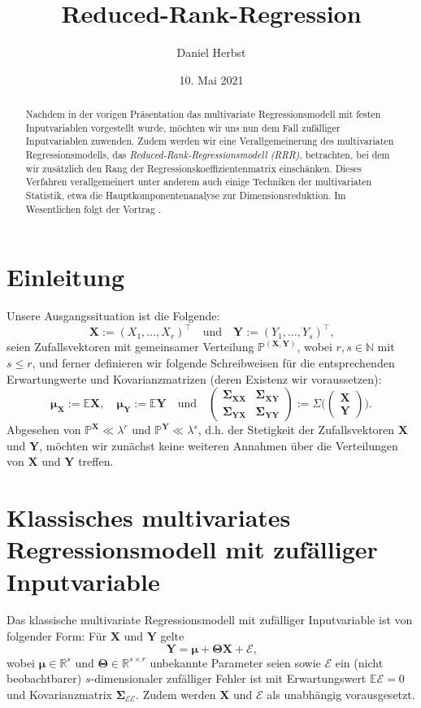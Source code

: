 \documentclass[]{article}
\title{Reduced-Rank-Regression}
\author{Daniel Herbst}
\date{10. Mai 2021}
\newcommand{\Pb}{\mathbb{P}}
\newcommand{\E}{\mathbb{E}}
\newcommand{\R}{\mathbb{R}}
\newcommand{\N}{\mathbb{N}}
\newcommand{\X}{\mathbf{X}}
\newcommand{\Y}{\mathbf{Y}}
\newcommand{\T}{\mathbf{\Theta}}
\newcommand{\muu}{\bm{\mu}}
\newcommand{\Ssigma}{\mathbf{\Sigma}}
\begin{document}
\maketitle

\begin{abstract}
Nachdem in der vorigen Präsentation das multivariate Regressionsmodell mit festen Inputvariablen vorgestellt wurde, möchten wir uns nun dem Fall zufälliger Inputvariablen zuwenden. Zudem werden wir eine Verallgemeinerung des multivariaten Regressionsmodells, das
\textit{Reduced-Rank-Regressionsmodell (RRR)}, betrachten, bei dem wir zusätzlich den Rang der Regressionskoeffizientenmatrix einschänken. Dieses Verfahren verallgemeinert unter anderem auch einige Techniken der multivariaten Statistik, etwa die Hauptkomponentenanalyse zur Dimensionsreduktion. Im Wesentlichen folgt der Vortrag 
\cite[Kapitel 6.3]{Iz08}.
\end{abstract}

\section{Einleitung}
\label{Einleitung}
Unsere Ausgangssituation ist die Folgende:
$$\X := (X_1, \dots, X_r)^\top \quad \text{und} \quad \Y := (Y_1, \dots, Y_s)^\top \text{,}$$
seien Zufallsvektoren mit gemeinsamer Verteilung $\Pb^{(\X, \Y)}$, wobei $r, s \in \N$ mit $s \leq r$,
und ferner definieren wir folgende Schreibweisen für die entsprechenden Erwartungwerte und Kovarianzmatrizen (deren Existenz wir voraussetzen):
$$ \muu_\X := \E\X, \quad \muu_\Y := \E\Y \quad \text{und} \quad \begin{pmatrix}
	\Ssigma_{\X\X} & \Ssigma_{\X\Y} \\
	\Ssigma_{\Y\X} & \Ssigma_{\Y\Y}
\end{pmatrix} := \Sigma \biggl(\begin{pmatrix}
\X \\
\Y
\end{pmatrix}\biggr).$$
Abgesehen von $\Pb^\X \ll \lambda^r$ und $\Pb^\Y \ll \lambda^s$, d.h. der Stetigkeit der Zufallsvektoren $\X$ und $\Y$, möchten wir zunächst keine
weiteren Annahmen über die Verteilungen von $\X$ und $\Y$ treffen.

\section{Klassisches multivariates Regressionsmodell mit zufälliger Inputvariable}

Das klassische multivariate Regressionsmodell mit zufälliger Inputvariable ist von folgender Form: Für $\X$ und $\Y$ gelte
\[ \Y = \muu + \T \X + \mathcal{E} \text{,} \label{eq:2.1} \tag{2.1}\]
wobei $\muu \in \R^s$ und $\T \in \R^{s \times r}$ unbekannte Parameter seien sowie $\mathcal{E}$ ein (nicht beobachtbarer) $s$-dimensionaler zufälliger Fehler ist mit Erwartungswert $\E \mathcal{E} = 0$ und Kovarianzmatrix $\Ssigma_{\mathcal{E} \mathcal{E}}$. Zudem werden $\X$ und
$\mathcal{E}$ als unabhängig vorausgesetzt.
\\
\end{document}

